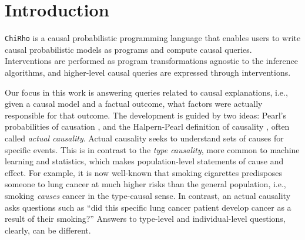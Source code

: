 \documentclass[twoside,11pt]{article}
\renewcommand{\texttt}[1]{\lstinline[basicstyle=\fontsize{8pt}{8.25pt}\selectfont\ttfamily]{#1}}
\newcommand{\poorva}[1]{{\color{blue}[Poorva: #1]}}
\begin{document}





\section{Introduction}

\texttt{ChiRho} is a causal probabilistic programming language that enables users to write causal probabilistic models as programs and compute causal queries. Interventions are performed as program transformations agnostic to the inference algorithms, and higher-level causal queries are expressed through interventions. 

Our focus in this work is answering queries related to causal explanations, i.e., given a causal model and a factual outcome, what factors were actually responsible for that outcome. The development is guided by two ideas: Pearl's probabilities of causation \cite{pearl2022probabilities}, and the Halpern-Pearl definition of causality \cite{actualCausalityHalpern}, often called \emph{actual causality}. Actual causality seeks to understand sets of causes for specific events. This is in contrast to the \emph{type causality}, more common to machine learning and statistics, which makes population-level statements of cause and effect. For example, it is now well-known that smoking cigarettes predisposes someone to lung cancer at much higher risks than the general population, i.e., smoking \emph{causes} cancer in the type-causal sense. In contrast, an actual causality asks questions such as ``did this specific lung cancer patient develop cancer as a result of their smoking?'' Answers to type-level and individual-level questions, clearly, can be different.
\end{document}
